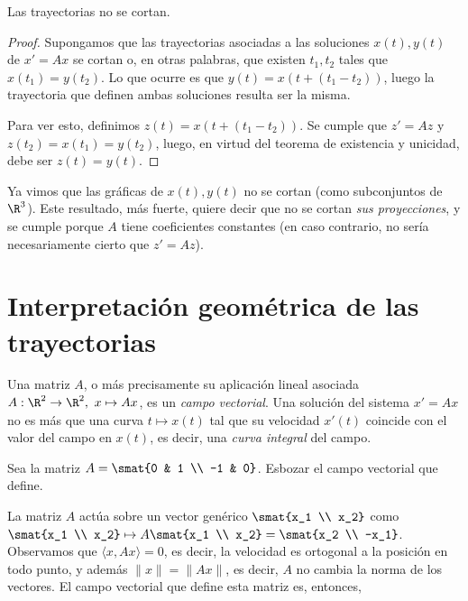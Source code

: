 \documentclass[../ecuaciones_diferenciales.tex]{subfiles}
\begin{document}
\begin{theorem}
	Las trayectorias no se cortan.
	\begin{proof}
		Supongamos que las trayectorias asociadas a las soluciones \(x(t), y(t)\) de
		\(x' = Ax\) se cortan o, en otras palabras, que existen \(t_1, t_2\) tales
		que \(x(t_1) = y(t_2)\). Lo que ocurre es que \(y(t) = x(t + (t_1-t_2))\),
		luego la trayectoria que definen ambas soluciones resulta ser la misma.

		Para ver esto, definimos \(z(t) = x(t + (t_1-t_2))\). Se cumple que \(z' =
		Az\) y \(z(t_2) = x(t_1) = y(t_2)\), luego, en virtud del teorema de
		existencia y unicidad, debe ser \(z(t) = y(t)\).
	\end{proof}
\end{theorem}

\begin{remark}
	Ya vimos que las gráficas de \(x(t), y(t)\) no se cortan (como subconjuntos de
	\(\R^3\)). Este resultado, más fuerte, quiere decir que no se cortan \emph{sus
		proyecciones}, y se cumple porque \(A\) tiene coeficientes constantes (en
	caso contrario, no sería necesariamente cierto que \(z' = Az\)).
\end{remark}

\section{Interpretación geométrica de las trayectorias}

Una matriz \(A\), o más precisamente su aplicación lineal asociada \(A : \R^2
\to \R^2,\ x \mapsto Ax\), es un \emph{campo vectorial}. Una solución del
sistema \(x' = Ax\) no es más que una curva \(t \mapsto x(t)\) tal que su
velocidad \(x'(t)\) coincide con el valor del campo en \(x(t)\), es decir, una
\emph{curva integral} del campo.

\begin{example} \label{ex:campo_vec}
	Sea la matriz \(A = \smat{0 & 1 \\ -1 & 0}\). Esbozar el campo vectorial que
	define.

	La matriz \(A\) actúa sobre un vector genérico \(\smat{x_1 \\ x_2}\) como
	\(\smat{x_1 \\ x_2} \mapsto A\smat{x_1 \\ x_2} = \smat{x_2 \\ -x_1}\).
	Observamos que \(\langle x, Ax \rangle = 0\), es decir, la velocidad es
	ortogonal a la posición en todo punto, y además \(\|x\| = \|Ax\|\), es decir,
	\(A\) no cambia la norma de los vectores. El campo vectorial que define esta
	matriz es, entonces,
\end{example}
\end{document}
